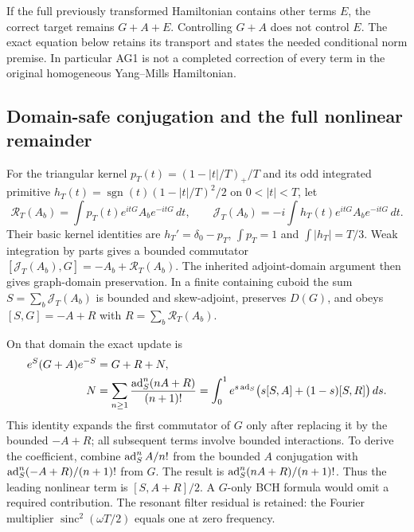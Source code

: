 If the full previously transformed Hamiltonian contains other terms $E$, the correct target remains $G+A+E$. Controlling $G+A$ does not control $E$. The exact equation below retains its transport and states the needed conditional norm premise. In particular AG1 is not a completed correction of every term in the original homogeneous Yang--Mills Hamiltonian.

\subsection{Domain-safe conjugation and the full nonlinear remainder}
For the triangular kernel $p_T(t)=(1-|t|/T)_+/T$ and its odd integrated primitive
$h_T(t)=\operatorname{sgn}(t)(1-|t|/T)^2/2$ on $0<|t|<T$, let
\begin{equation}
\mathcal R_T(A_b)=\int p_T(t)e^{itG}A_be^{-itG}\,dt,
\qquad
\mathcal J_T(A_b)=-i\int h_T(t)e^{itG}A_be^{-itG}\,dt.
\label{eq:filters}
\end{equation}
Their basic kernel identities are $h_T'=\delta_0-p_T$, $\int p_T=1$ and
$\int|h_T|=T/3$. Weak integration by parts gives a bounded commutator
$[\mathcal J_T(A_b),G]=-A_b+\mathcal R_T(A_b)$. The inherited adjoint-domain argument then gives graph-domain preservation. In a finite containing cuboid the sum $S=\sum_b\mathcal J_T(A_b)$ is bounded and skew-adjoint, preserves $D(G)$, and obeys
$[S,G]=-A+R$ with $R=\sum_b\mathcal R_T(A_b)$.

On that domain the exact update is
\begin{align}
e^S(G+A)e^{-S}&=G+R+N,\nonumber\\
N&=\sum_{n\ge1}\frac{\operatorname{ad}_S^n(nA+R)}{(n+1)!}
=\int_0^1e^{s\operatorname{ad}_S}\bigl(s[S,A]+(1-s)[S,R]\bigr)\,ds.
\label{eq:bch}
\end{align}
This identity expands the first commutator of $G$ only after replacing it by the bounded $-A+R$; all subsequent terms involve bounded interactions. To derive the coefficient, combine $\operatorname{ad}_S^nA/n!$ from the bounded $A$ conjugation with $\operatorname{ad}_S^n(-A+R)/(n+1)!$ from $G$. The result is $\operatorname{ad}_S^n(nA+R)/(n+1)!$. Thus the leading nonlinear term is $[S,A+R]/2$. A $G$-only BCH formula would omit a required contribution. The resonant filter residual is retained: the Fourier multiplier $\operatorname{sinc}^2(\omega T/2)$ equals one at zero frequency.

